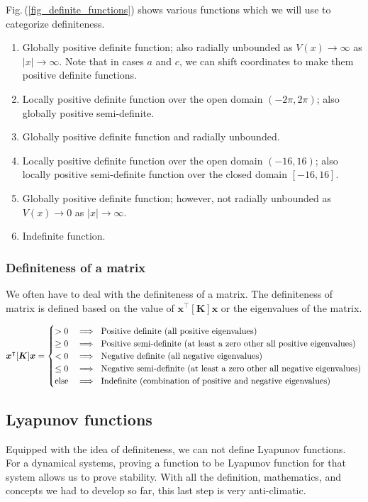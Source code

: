 \documentclass{article}
\begin{document}
Fig.\,(\ref{fig_definite_functions}) shows various functions which we will use to categorize definiteness.
\begin{enumerate}[noitemsep]
  \item Globally positive definite function; also radially unbounded as $V(x)\rightarrow\infty$ as $|x|\rightarrow \infty$. Note that in cases $a$ and $c$, we can shift coordinates to make them positive definite functions.
  \item Locally positive definite function over the open domain $(-2\pi,2\pi)$; also globally positive semi-definite.
  \item Globally positive definite function and radially unbounded.
  \item Locally positive definite function over the open domain $(-16,16)$; also locally positive semi-definite function over the closed domain $[-16,16]$.
  \item Globally positive definite function; however, not radially unbounded as $V(x)\rightarrow 0$ as $|x|\rightarrow\infty$.
  \item Indefinite function.
\end{enumerate}

\subsubsection*{Definiteness of a matrix}
We often have to deal with the definiteness of a matrix. The definiteness of matrix is defined based on the value of $\bm{x}^{\intercal}[\bm{K}]\bm{x}$ or the eigenvalues of the matrix.

$$
\bm{x}^{\intercal}[\bm{K}]\bm{x} = 
\begin{cases}
 >0&\implies\textnormal{ Positive definite (all positive eigenvalues)}\\  
 \geq0&\implies\textnormal{ Positive semi-definite (at least a zero other all positive eigenvalues)}\\  
 <0&\implies\textnormal{ Negative definite (all negative eigenvalues)}\\  
 \leq0&\implies\textnormal{ Negative semi-definite (at least a zero other all negative eigenvalues)}\\ 
 \textnormal{else}&\implies\textnormal{ Indefinite (combination of positive and negative eigenvalues)}
\end{cases}
$$

\subsection{Lyapunov functions}
Equipped with the idea of definiteness, we can not define Lyapunov functions. For a dynamical systems, proving a function to be Lyapunov function for that system allows us to prove stability. With all the definition, mathematics, and concepts we had to develop so far, this last step is very anti-climatic.
\end{document}
